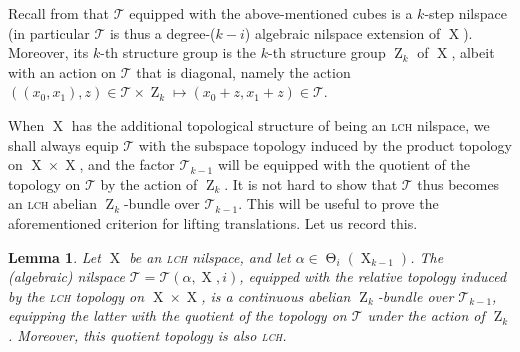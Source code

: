 \documentclass[a4paper,12pt,reqno]{amsart}
\newtheorem{lemma}[theorem]{Lemma}
\theoremstyle{definition}
\newcommand{\mc}{\mathcal}
\DeclareMathOperator{\ab}{Z}
\DeclareMathOperator{\tran}{\Theta}
\DeclareMathOperator{\ns}{X}
\begin{document}
\noindent Recall from \cite[\S 3.3.4]{Cand:Notes1} that $\mc{T}$ equipped with the above-mentioned cubes is a $k$-step nilspace (in particular $\mc{T}$ is thus a degree-($k-i$) algebraic nilspace extension of $\ns$). Moreover, its $k$-th structure group is the $k$-th structure group $\ab_k$ of $\ns$, albeit with an action on $\mc{T}$ that is diagonal, namely the action $((x_0,x_1),z)\in \mc{T}\times \ab_k \mapsto (x_0+z,x_1+z)\in \mc{T}$.

When $\ns$ has the additional topological structure of being an \textsc{lch} nilspace, we shall always equip $\mc{T}$ with the subspace topology induced by the product topology on $\ns\times \ns$, and the factor $\mc{T}_{k-1}$ will be equipped with the quotient of the topology on $\mc{T}$ by the action of $\ab_k$. It is not hard to show that $\mc{T}$ thus becomes an \textsc{lch} abelian $\ab_k$-bundle over $\mc{T}_{k-1}$. This will be useful to prove the aforementioned criterion for lifting translations. Let us record this.
\begin{lemma}\label{lem:transbnd-ctsbnd}
Let $\ns$ be an \textsc{lch} nilspace, and let $\alpha\in \tran_i(\ns_{k-1})$. The (algebraic) nilspace $\mc{T}=\mc{T}(\alpha,\ns,i)$, equipped with the relative topology induced by the \textsc{lch} topology on $\ns\times \ns$, is a continuous abelian $\ab_k$-bundle over $\mc{T}_{k-1}$, equipping the latter with the quotient of the topology on $\mc{T}$ under the action of $\ab_k$. Moreover, this quotient topology is also \textsc{lch}.
\end{lemma}
\end{document}
